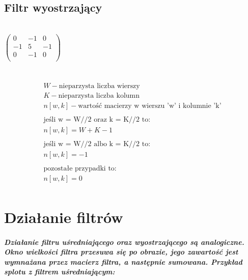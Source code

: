 \documentclass[a4paper,12pt,openany]{report}
\begin{document}
\section{Filtr wyostrzający}
\\
\linebreak
$\begin{pmatrix}
0 & -1 & 0 \\
-1 & 5 & -1 \\
0 & -1 & 0 \\
\end{pmatrix}$
\\
\linebreak
{}
\\
\linebreak
{}
\\
\linebreak
\begin{gather*}
W - \text{nieparzysta liczba wierszy} \\
K - \text{nieparzysta liczba kolumn} \\
n[w, k] - \text{wartość macierzy w wierszu 'w' i kolumnie 'k'} \\
\\
\text{jeśli w = W//2 oraz k = K//2 to:}\\
n[w, k] = W + K - 1\\
\\
\text{jeśli w = W//2 albo k = K//2 to:}\\
n[w, k] = -1\\
\\
\text{pozostałe przypadki to:}\\
n[w, k] = 0\\
\end{gather*}


\chapter{Działanie filtrów}

\paragraph{\indent Działanie filtru uśredniającego oraz wyostrzającego są analogiczne. Okno wielkości filtra przesuwa się po obrazie, jego zawartość jest wymnażana przez macierz filtra, a następnie sumowana. Przykład splotu z filtrem uśredniającym:}
\end{document}

